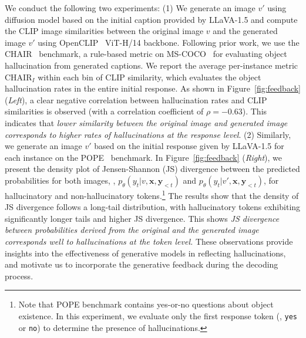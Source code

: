 We conduct the following two experiments:
(1) We generate an image $v'$ using diffusion model based on the initial caption provided by LLaVA-1.5 and compute the CLIP image similarities between the original image $v$ and the generated image $v'$ using OpenCLIP~\citep{cherti2023reproducible} ViT-H/14 backbone. Following prior work, we use the CHAIR~\citep{rohrbach2018object} benchmark, a rule-based metric on MS-COCO~\citep{lin2014microsoft} for evaluating object hallucination from generated captions. We report the average per-instance metric $\text{CHAIR}_I$ within each bin of CLIP similarity, which evaluates the object hallucination rates in the entire initial response. 
As shown in Figure~\ref{fig:feedback} (\textit{Left}), a clear negative correlation between hallucination rates and CLIP similarities is observed (with a correlation coefficient of $\rho=-0.63$).  This indicates that \textit{lower similarity between the original image and generated image corresponds to higher rates of hallucinations at the response level}.
(2) Similarly, we generate an image $v'$ based on the initial response given by LLaVA-1.5 for each instance on the POPE~\citep{li2023evaluating} benchmark. In Figure~\ref{fig:feedback} (\textit{Right}), we present the density plot of Jensen-Shannon (JS) divergence between the predicted probabilities for both images, \ie, $p_{\theta}(y_t | v, \mathbf{x}, \mathbf{y}_{<t})$ and $p_{\theta}(y_t | v', \mathbf{x}, \mathbf{y}_{<t})$, for hallucinatory and non-hallucinatory tokens.\footnote{Note that POPE benchmark contains yes-or-no questions about object existence. In this experiment, we evaluate only the first response token (\ie, \texttt{yes} or \texttt{no}) to determine the presence of hallucinations.} The results show that the density of JS divergence follows a long-tail distribution, with hallucinatory tokens exhibiting significantly longer tails and higher JS divergence. This shows \textit{JS divergence between probabilities derived from the original and the generated image corresponds well to hallucinations at the token level.}
These observations provide insights into the effectiveness of generative models in reflecting hallucinations, and motivate us to incorporate the generative feedback during the decoding process.


